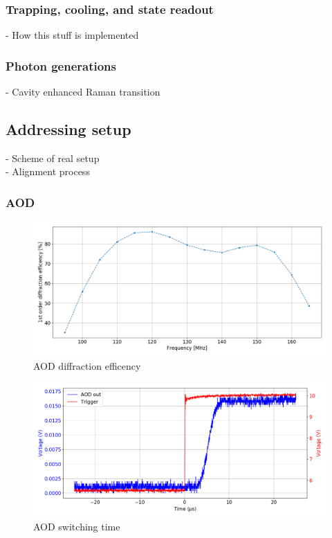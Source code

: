 \documentclass[english, a4paper, 12pt, twoside]{article}
\numberwithin{equation}{section} %
\begin{document}
\subsubsection{Trapping, cooling, and state readout}
- How this stuff is implemented
\subsubsection{Photon generations}
- Cavity enhanced Raman transition
\subsection{Addressing setup}
- Scheme of real setup \\
- Alignment process


\subsubsection{AOD}
\begin{figure}[H]
\centering
\includegraphics[width=\textwidth]{img/DE}
\caption{AOD diffraction efficency}
\end{figure}

\begin{figure}[H]
\centering
\includegraphics[width=\textwidth]{img/response}
\caption{AOD switching time}
\end{figure}
\end{document}

